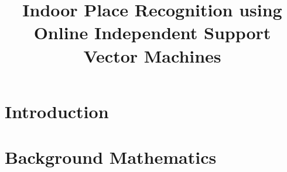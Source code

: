 \documentclass{bmvc}
\begin{document}

\title{Indoor Place Recognition using Online Independent Support Vector Machines}


\author{}

\maketitle


\begin{abstract}
  
\end{abstract}

\section{Introduction}
\label{introduction}


%

\section{Background Mathematics}
\label{sec:bg}

\end{document}
